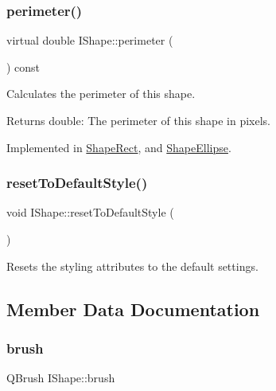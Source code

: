 \subsubsection{\texorpdfstring{perimeter()}{perimeter()}}
{\footnotesize\ttfamily virtual double I\+Shape\+::perimeter (\begin{DoxyParamCaption}{ }\end{DoxyParamCaption}) const\hspace{0.3cm}{\ttfamily [pure virtual]}}



Calculates the perimeter of this shape. 

\begin{DoxyReturn}{Returns}
double\+: The perimeter of this shape in pixels. 
\end{DoxyReturn}


Implemented in \mbox{\hyperlink{class_shape_rect_a7dba46671dfd64188b37bff161d3bb89}{Shape\+Rect}}, and \mbox{\hyperlink{class_shape_ellipse_a397c01c912105854e065f6c2d766f73a}{Shape\+Ellipse}}.

\mbox{\label{class_i_shape_a3f1e70475296c2e897df28a7facb5bad}} 
\subsubsection{\texorpdfstring{resetToDefaultStyle()}{resetToDefaultStyle()}}
{\footnotesize\ttfamily void I\+Shape\+::reset\+To\+Default\+Style (\begin{DoxyParamCaption}{ }\end{DoxyParamCaption})}



Resets the styling attributes to the default settings. 



\subsection{Member Data Documentation}
\mbox{\label{class_i_shape_a3827e9f0c3c88331ceaa3bb9b00f7073}} 
\subsubsection{\texorpdfstring{brush}{brush}}
{\footnotesize\ttfamily Q\+Brush I\+Shape\+::brush}

